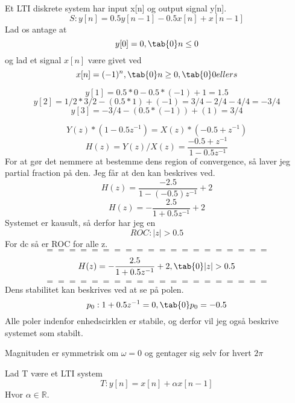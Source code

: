 \begin{rubrik}
\begin{eksamensOpgave}
\begin{UnderOpgave}
        \end{UnderOpgave}
    \end{eksamensOpgave}
    \begin{eksamensOpgave}
        Et LTI diskrete system har input x[n] og output signal y[n]. 
        \[S: y[n] = 0.5 y[n - 1] - 0.5 x[n] + x[n - 1]\]
        Lad os antage at 
        \[y[0] = 0, \tab{0} n \leq 0\]
        og lad et signal $x[n]$ være givet ved 
        \[x[n] = (-1)^n, \tab{0} n \geq 0, \tab{0} 0 ellers\]
        \begin{UnderOpgave}[Beregn for n = 1, 2, 3]
            \[y[1] = 0.5 * 0 - 0.5*(-1) + 1 = 1.5\]
            \[y[2] = 1/2 * 3/2 - (0.5 * 1) + (-1) = 3/4 - 2/4 - 4/4 = -3/4\]
            \[y[3] = -3/4 - (0.5 * (-1)) + (1) = 3/4\]
        \end{UnderOpgave}        
        \begin{UnderOpgave}
            \[Y(z) * (1 - 0.5z^{-1}) = X(z) * (-0.5 + z^{-1})\]
            \[H(z) = Y(z)/X(z) = \frac{-0.5 + z^{-1}}{1 - 0.5z^{-1}}\]
            For at gør det nemmere at bestemme dens region of convergence, så laver jeg partial fraction på den. 
            Jeg får at den kan beskrives ved. 
            \[H(z) = \frac{-2.5}{1 - (-0.5)z^{-1}} + 2\]
            \[H(z) = -\frac{2.5}{1 + 0.5z^{-1}} + 2\]
            Systemet er kausult, så derfor har jeg en 
            \[ROC: |z| > 0.5\]
            For dc så er ROC for alle z. 
            \[====================\]
            \[H(z) = -\frac{2.5}{1 + 0.5z^{-1}} + 2, \tab{0} |z| > 0.5\]
            \[====================\]
            Dens stabilitet kan beskrives ved at se på polen. 
            \[p_0: 1 + 0.5z^{-1} = 0, \tab{0} p_0 = -0.5\]
            Alle poler indenfor enhedscirklen er stabile, og derfor vil jeg også beskrive systemet som stabilt. 
        \end{UnderOpgave}
        \begin{UnderOpgave}
            Magnituden er symmetrisk om $\omega = 0$ og gentager sig selv for hvert $2\pi$
        \end{UnderOpgave}
        Lad T være et LTI system
        \[T: y[n] = x[n] + \alpha x[n - 1]\]
        Hvor $\alpha \in \mathbb{R}$. 
        \begin{UnderOpgave}

\end{UnderOpgave}
\end{eksamensOpgave}
\end{rubrik}
